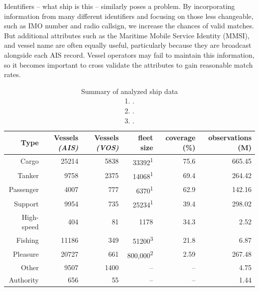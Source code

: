 Identifiers -- what ship is this -- similarly poses a problem. By incorporating information from many different identifiers and focusing on those less changeable, such as IMO number and radio callsign, we increase the chances of valid matches. But additional attributes such as the Maritime Mobile Service Identity (MMSI), and vessel name are often equally useful, particularly because they are broadcast alongside each AIS record. Vessel operators may fail to maintain this information, so it becomes important to cross validate the attributes to gain reasonable match rates.


\begin{table}[htbp]
  \begin{tabular}{rrrrrr} %
    \hline
    Type & Vessels \textit{(AIS)} & Vessels \textit{(VOS)} & fleet size & coverage (\%) & observations (M) \\
    \hline
    Cargo & 25214 & 5838 & 33392\textsuperscript{1} & 75.6 & 665.45 \\
    Tanker & 9758 & 2375 & 14068\textsuperscript{1} & 69.4 & 264.42 \\
    Passenger & 4007 & 777 & 6370\textsuperscript{1} & 62.9 & 142.16 \\
    Support & 9954 & 735 & 25234\textsuperscript{1} & 39.4 & 298.02 \\
    High-speed & 404 & 81 & 1178 & 34.3 & 2.52 \\
    Fishing & 11186 & 349 & 51200\textsuperscript{3} & 21.8 & 6.87 \\
    Pleasure & 20727 & 661 & 800,000\textsuperscript{2} & 2.59 & 267.48 \\
    Other & 9507 & 1400 & -- & -- & 4.75 \\
    Authority & 656 & 55 & -- & -- & 1.44 \\
  \end{tabular}
  \caption{Summary of analyzed ship data\\
  1. \cite{Equasis2011}.\\
  2. \cite{westwood2001global}.\\
  3. \cite{FAOfishing}.}
  \label{table:ships-by-type}
\end{table}


